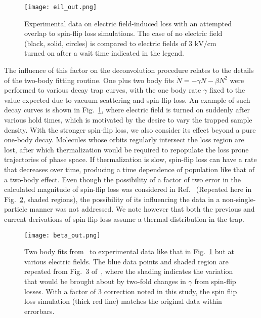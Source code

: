 \documentclass[%
 reprint,
 amsmath,amssymb,
 aps,
prl,
]{revtex4-1}
\begin{document}
\begin{figure}[t]
\texttt{[image: eil\_out.png]}
\caption{Experimental data on electric field-induced loss with an attempted overlap to spin-flip loss simulations. The case of no electric field (black, solid, circles) is compared to electric fields of $3\text{ kV/cm}$ turned on after a wait time indicated in the legend.
\label{fig:eil}}
\end{figure}

The influence of this factor on the deconvolution procedure relates to the details of the two-body fitting routine.
One plus two body fits $\dot{N}=-\gamma N-\beta N^2$ were performed to various decay trap curves, with the one body rate $\gamma$ fixed to the value expected due to vacuum scattering and spin-flip loss.
An example of such decay curves is shown in Fig.~\ref{fig:eil}, where electric field is turned on suddenly after various hold times, which is motivated by the desire to vary the trapped sample density.
With the stronger spin-flip loss, we also consider its effect beyond a pure one-body decay. Molecules whose orbits regularly intersect the loss region are lost, after which thermalization would be required to repopulate the loss prone trajectories of phase space. If thermalization is slow, spin-flip loss can have a rate that decreases over time, producing a time dependence of population like that of a two-body effect.
Even though the possibility of a factor of two error in the calculated magnitude of spin-flip loss was considered in Ref.~\cite{Stuhl2013} (Repeated here in Fig.~\ref{fig:beta}, shaded regions), the possibility of its influencing the data in a non-single-particle manner was not addressed. We note however that both the previous and current derivations of spin-flip loss assume a thermal distribution in the trap.

\begin{figure}[t]
\texttt{[image: beta\_out.png]}
\caption{Two body fits from~\cite{Stuhl2013} to experimental data like that in Fig.~\ref{fig:eil} but at various electric fields. The blue data points and shaded region are repeated from Fig.~3 of~\cite{Stuhl2013}, where the shading indicates the variation that would be brought about by two-fold changes in $\gamma$ from spin-flip losses. With a factor of 3 correction noted in this study, the spin flip loss simulation (thick red line) matches the original data within errorbars.\label{fig:beta}}
\end{figure}
\end{document}
